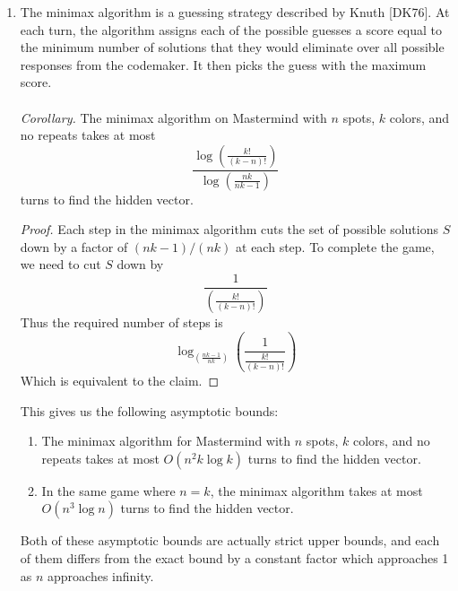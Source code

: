\documentclass[12pt, a4paper]{article}
\begin{document}
\begin{enumerate}
\begin{proof}
\begin{enumerate}[label=]
			Otherwise we have
			\begin{equation*}|C_{\alpha}|>\frac{nk-1}{nk}|S|\end{equation*}
			Then, this satisfies the conditions for Case 1 above, where we have a
			guess whose largest bucket is $B_j$ with $j>0$.
			\end{enumerate}
		\end{proof}
	\item The minimax algorithm is a guessing strategy described by Knuth [DK76].
	At each turn, the algorithm assigns each of the possible guesses a score equal
	to the minimum number of solutions that they would eliminate over all
	possible responses from the codemaker. It then picks the guess with the maximum
	score.\\\\
	\textit{Corollary.} The minimax algorithm on Mastermind with $n$ spots, $k$
	colors, and no repeats takes at most
		\begin{equation*}
		\frac{\log\left(\frac{k!}{(k-n)!}\right)}{\log\left(\frac{nk}{nk-1}\right)}
		\end{equation*}
	turns to find the hidden vector.
		\begin{proof}
		Each step in the minimax algorithm cuts the set of possible solutions $S$ down
		by a factor of $(nk-1)/(nk)$ at each step. To complete the game, we need to
		cut $S$ down by
			\begin{equation*}
			\frac{1}{\left(\frac{k!}{(k-n)!}\right)}
			\end{equation*}
		Thus the required number of steps is
			\begin{equation*}
			\log_{\left(\frac{nk-1}{nk}\right)}\left(\frac{1}{\frac{k!}{(k-n)!}}\right)
			\end{equation*}
		Which is equivalent to the claim.
		\end{proof}
	This gives us the following asymptotic bounds:
		\begin{enumerate}[label=\roman*.]
		\item The minimax algorithm for Mastermind with $n$ spots, $k$
		colors, and no repeats takes at most $O(n^2k\log k)$ turns to find the
		hidden vector.
		
		\item In the same game where $n=k$, the minimax algorithm takes at most
		$O(n^3\log n)$ turns to find the hidden vector.
		\end{enumerate}
	Both of these asymptotic bounds are actually strict upper bounds, and 
	each of them differs from the exact bound by a constant factor which approaches
	1 as $n$ approaches infinity.
	\end{enumerate}
	
\end{document}
